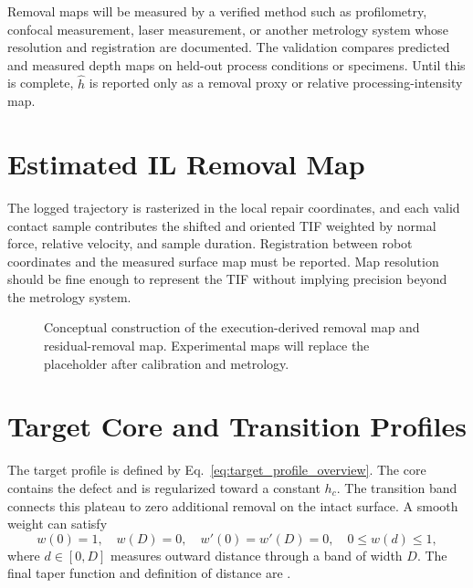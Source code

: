Removal maps will be measured by a verified method such as profilometry, confocal measurement, laser measurement, or another metrology system whose resolution and registration are documented.  The validation compares predicted and measured depth maps on held-out process conditions or specimens. Until this is complete, \(\hat h\) is reported only as a removal proxy or relative processing-intensity map.

\section{Estimated IL Removal Map}
The logged trajectory is rasterized in the local repair coordinates, and each valid contact sample contributes the shifted and oriented TIF weighted by normal force, relative velocity, and sample duration. Registration between robot coordinates and the measured surface map must be reported. Map resolution should be fine enough to represent the TIF without implying precision beyond the metrology system.

\begin{figure}[t]
  \centering
  \caption{Conceptual construction of the execution-derived removal map and residual-removal map. Experimental maps will replace the placeholder after calibration and metrology.}
  \label{fig:removal_and_residual_maps}
\end{figure}

\section{Target Core and Transition Profiles}
The target profile is defined by Eq.~\eqref{eq:target_profile_overview}. The core contains the defect and is regularized toward a constant \(h_c\). The transition band connects this plateau to zero additional removal on the intact surface. A smooth weight can satisfy
\begin{equation}
  w(0)=1,\quad w(D)=0,\quad
  w'(0)=w'(D)=0,\quad 0\leq w(d)\leq 1,
  \label{eq:transition_conditions}
\end{equation}
where \(d\in[0,D]\) measures outward distance through a band of width \(D\). The final taper function and definition of distance are .

